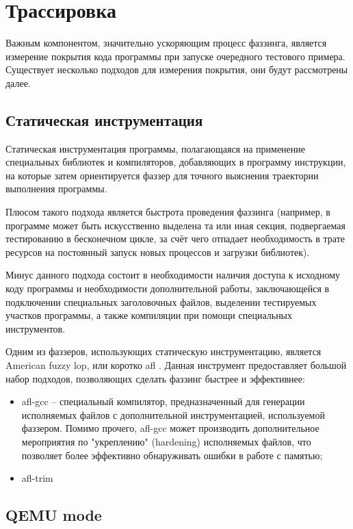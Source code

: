 \section{Трассировка}\label{sec:trace}

Важным компонентом, значительно ускоряющим процесс фаззинга, является измерение покрытия кода программы при запуске очередного тестового примера. Существует несколько подходов для измерения покрытия, они будут рассмотрены далее.


\subsection{Статическая инструментация}

Статическая инструментация программы, полагающаяся на применение специальных библиотек и компиляторов, добавляющих в программу инструкции, на которые затем ориентируется фаззер для точного выяснения траектории выполнения программы.

Плюсом такого подхода является быстрота проведения фаззинга (например, в программе может быть искусственно выделена та или иная секция, подвергаемая тестированию в бесконечном цикле, за счёт чего отпадает необходимость в трате ресурсов на постоянный запуск новых процессов и загрузки библиотек).

Минус данного подхода состоит в необходимости наличия доступа к исходному коду программы и необходимости дополнительной работы, заключающейся в подключении специальных заголовочных файлов, выделении тестируемых участков программы, а также компиляции при помощи специальных инструментов.

Одним из фаззеров, использующих статическую инструментацию, является American fuzzy lop, или коротко afl \cite{afl}. Данная инструмент предоставляет большой набор подходов, позволяющих сделать фаззинг быстрее и эффективнее:

\begin{itemize}
	\item afl-gcc -- специальный компилятор, предназначенный для генерации исполняемых файлов с дополнительной инструментацией, используемой фаззером. Помимо прочего, afl-gcc может производить дополнительное мероприятия по "укреплению" (hardening) исполняемых файлов, что позволяет более эффективно обнаруживать ошибки в работе с памятью; 
	\item afl-trim %
\end{itemize}

\subsection{QEMU mode}

